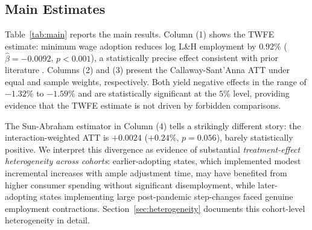 \documentclass[12pt]{article}
\begin{document}
\subsection{Main Estimates}

Table~\ref{tab:main} reports the main results.  Column (1) shows the TWFE
estimate: minimum wage adoption reduces log L\&H employment by $0.92\%$
($\hat{\beta} = -0.0092$, $p < 0.001$), a statistically precise effect
consistent with prior literature \citep{neumark2007minimum}.  Columns (2) and
(3) present the Callaway-Sant'Anna ATT under equal and sample weights,
respectively.  Both yield negative effects in the range of $-1.32\%$ to
$-1.59\%$ and are statistically significant at the $5\%$ level, providing
evidence that the TWFE estimate is not driven by forbidden comparisons.

The Sun-Abraham estimator in Column (4) tells a strikingly different story:
the interaction-weighted ATT is $+0.0024$ ($+0.24\%$, $p = 0.056$), barely
statistically positive.  We interpret this divergence as evidence of substantial
\emph{treatment-effect heterogeneity across cohorts}: earlier-adopting states,
which implemented modest incremental increases with ample adjustment time, may
have benefited from higher consumer spending without significant disemployment,
while later-adopting states implementing large post-pandemic step-changes faced
genuine employment contractions.  Section~\ref{sec:heterogeneity} documents
this cohort-level heterogeneity in detail.
\end{document}
